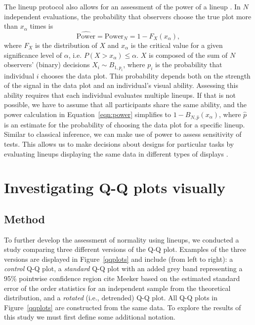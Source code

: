 \documentclass{article}\usepackage[]{graphicx}\usepackage[]{color}
\newcommand{\hh}[1]{{\color{orange} #1}}
\newcommand{\al}[1]{{\color{red} #1}}
\begin{document}
The lineup protocol also allows for an assessment of the power of a lineup \citep{mahbub:2013}. 
In $N$ independent evaluations, the probability that observers
choose the true plot more than $x_\alpha$ times is
\begin{equation}\label{eqn:power}
\widehat{\text{Power}} = \text{Power}_{N} = 1 - F_{X} (x_{\alpha}),
\end{equation}
where $F_X$ is the distribution of $X$ and $x_\alpha$ is the critical value for a given significance level of $\alpha$, i.e. $P(X >  x_{\alpha}) \le \alpha$. $X$ is composed of the sum of $N$ observers' (binary) decisions $X_i \sim B_{1, p_i}$, where  $p_i$ is the probability that individual $i$ chooses the data plot. This probability  depends both on the strength of the signal in the data plot and an individual's visual ability.
Assessing this ability requires that each individual evaluates multiple lineups. 
If that is not possible, we have to assume that all participants share the same ability, and the power calculation in Equation~\ref{eqn:power} simplifies to $1 - B_{N, \hat{p}}(x_\alpha)$, where $\widehat{p}$ is an estimate for the probability of choosing the data plot for a specific lineup. Similar to classical inference, we can make use of power to assess sensitivity of tests. This allows us to make decisions about designs for particular tasks by evaluating lineups displaying  the same data in different types of displays \citep{Hofmann:2012ts}. 

\section{Investigating Q-Q plots visually}\label{sec:qqplot}

\subsection{Method}

To further \al{develop} the assessment of normality using lineups, we conducted a study comparing three different versions of the Q-Q plot.
Examples of the three versions are displayed in Figure~\ref{qqplots} and include (from left to right): a \emph{control} Q-Q plot, a \emph{standard} Q-Q plot with an added grey band representing a 95\% pointwise confidence region \hh{cite Meeker} based on the estimated standard error of the order statistics for an independent sample from the theoretical distribution,
 and a \emph{rotated} (i.e., detrended) Q-Q plot. All Q-Q plots in Figure~\ref{qqplots} are constructed from the same data. To explore the results of this study we must first define some additional notation.
\end{document}
